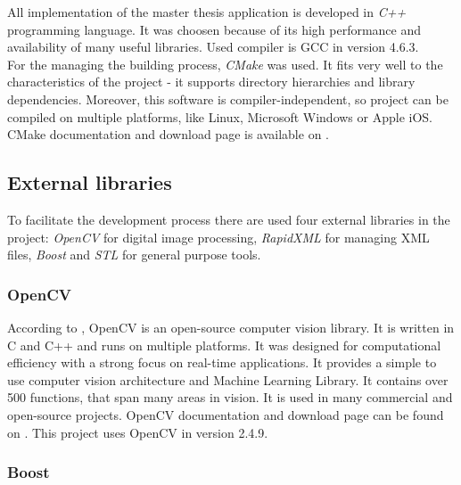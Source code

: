 \documentclass[a4paper,onecolumn,oneside,12pt]{memoir}
\begin{document}
All implementation of the master thesis application is developed in \textit{C++} programming 
language. It was choosen because of its high performance and availability of many useful libraries.
Used compiler is GCC in version 4.6.3. \\

For the managing the building process, \textit{CMake} was used. It fits very well to the
characteristics of the project - it supports directory hierarchies and library dependencies.
Moreover, this software is compiler-independent, so project can be compiled on multiple platforms,
like Linux, Microsoft Windows or Apple iOS. CMake documentation and download page is available on
\cite{cmakeMainPage}.

\subsection{External libraries}
\label{externalLibrariesSection}
To facilitate the development process there are used four external libraries in the project:
\textit{OpenCV} for digital image processing, \textit{RapidXML} for managing XML files,
\textit{Boost} and \textit{STL} for general purpose tools.

\subsubsection{OpenCV}

According to \cite{learningOpenCv}, OpenCV is an open-source computer vision library. It is written
in C and C++ and runs on multiple platforms. It was designed for computational efficiency with a
strong focus on real-time applications. It provides a simple to use computer vision architecture
and Machine Learning Library. It contains over 500 functions, that span many areas in vision. It is
used in many commercial and open-source projects. OpenCV documentation and download page can be
found on \cite{opencvMainPage}. This project uses OpenCV in version 2.4.9.

\subsubsection{Boost}
\end{document}
